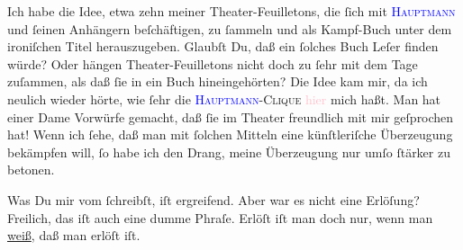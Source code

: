 \pstart
           Ich habe die Idee, etwa zehn meiner Theater-Feuilletons, die ſich mit \textsc{\textcolor{blue}{Hauptmann}{}\ledrightnote{\textcolor{blue}{Gerhart Hauptmann}}} und ſeinen Anhängern beſchäftigen, {\pb}zu ſammeln
               und als Kampf-Buch unter dem ironiſchen Titel \label{K_L03204-5v}\label{K_L03204-5h} herauszugeben. Glaubſt Du, daß ein ſolches Buch
               Leſer finden würde? Oder hängen Theater-Feuilletons nicht doch zu ſehr mit dem Tage
               zuſammen, als daß ſie in ein Buch hineingehörten? Die Idee kam mir, da ich neulich
               wieder hörte, wie ſehr die \textsc{\textcolor{blue}{Hauptmann}{}\ledrightnote{\textcolor{blue}{Gerhart Hauptmann}}-Clique}{ }\textcolor{pink}{hier}{}\ledrightnote{{$\rightarrow$}\textcolor{pink}{Berlin}} mich
               haßt. Man hat einer Dame Vorwürfe gemacht, daß ſie im Theater freundlich mit mir
               geſprochen hat! Wenn ich ſehe, daß man mit ſolchen Mitteln eine künſtleriſche
               Überzeugung {\pb}bekämpfen will, ſo habe ich den Drang,
               meine Überzeugung nur umſo ſtärker zu betonen.\pend
           
\pstart
           Was Du mir vom \label{K_L03204-6v}\label{K_L03204-6h} ſchreibſt, iſt ergreifend. Aber
                   war es nicht eine Erlöſung? Freilich, das iſt
               auch eine dumme Phraſe. Erlöſt iſt man doch nur, wenn man \uline{weiß}, daß man erlöſt iſt.\pend
           
